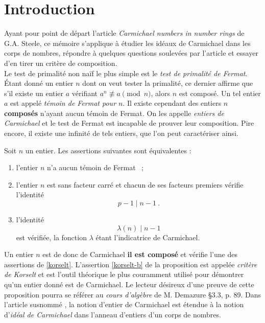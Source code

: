 \section*{Introduction}

Ayant pour point de départ l'article \textit{Carmichael numbers in number rings} \cite{article} de G.A. Steele, ce mémoire s'applique à étudier les idéaux de Carmichael dans les corps de nombres, répondre à quelques questions soulevées par l'article et essayer d'en tirer un critère de composition. \\

Le test de primalité non naïf le plus simple est le \emph{test de primalité de Fermat}. Étant donné un entier $n$ dont on veut tester la primalité, ce dernier affirme que s'il existe un entier $a$ vérifiant $a^n \not \equiv a \pmod{n}$, alors $n$ est composé. Un tel entier $a$ est appelé \emph{témoin de Fermat pour $n$}. Il existe cependant des entiers $n$ \textbf{composés} n'ayant aucun témoin de Fermat. On les appelle \emph{entiers de Carmichael} et le test de Fermat est incapable de prouver leur composition. Pire encore, il existe une infinité de tels entiers, que l'on peut caractériser ainsi.

\begin{proposition}\label{korselt} Soit $n$ un entier. Les assertions suivantes sont équivalentes :
	\begin{enumerate}[font=\normalshape]
		\item l'entier $n$ n'a aucun témoin de Fermat ~;
		\item l'entier $n$ est sans facteur carré et chacun de ses facteurs premiers vérifie l'identité \[p-1 \mid n-1 ~.\] \label{korselt-b}
		\item l'identité \[\lambda(n) \mid n-1\] est vérifiée, la fonction $\lambda$ étant l'indicatrice de Carmichael.
	\end{enumerate}
\end{proposition}

Un entier $n$ est de donc de Carmichael \ssi \textbf{il est composé} et vérifie l'une des assertions de \ref{korselt}. L'assertion \ref{korselt-b} de la proposition est appelée \textit{critère de Korselt} et est l'outil théorique le plus couramment utilisé pour démontrer qu'un entier donné est de Carmichael. Le lecteur désireux d'une preuve de cette proposition pourra se référer au \textit{cours d'algèbre} de M. Demazure \cite{Demazure} §3.3, p. 89. Dans l'article susnommé \cite{article}, la notion d'entier de Carmichael est étendue à la notion d'\emph{idéal de Carmichael} dans l'anneau d'entiers d'un corps de nombres.

